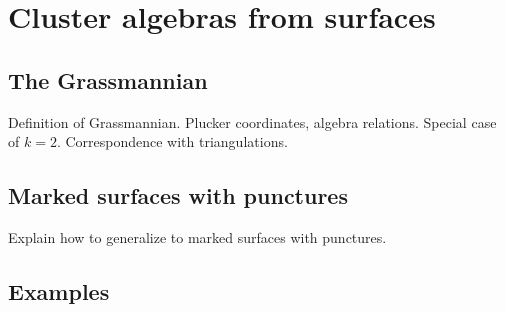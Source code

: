 \section{Cluster algebras from surfaces}\label{sec:cluster_algebras_surfaces}

\subsection{The Grassmannian}

Definition of Grassmannian. Plucker coordinates, algebra relations. Special case of
$k=2$. Correspondence with triangulations.
\subsection{Marked surfaces with punctures}\label{sec:triangulations_of_surfaces}
Explain how to generalize to marked surfaces with punctures.

\subsection{Examples}
